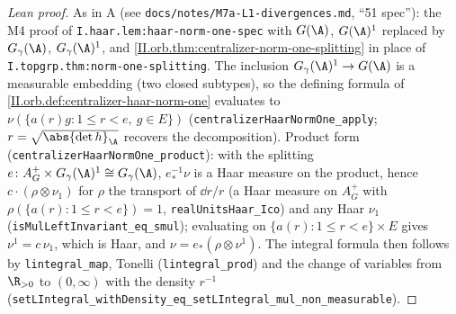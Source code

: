\begin{proof}[Lean proof]
As in A (see \texttt{docs/notes/M7a-L1-divergences.md}, ``51 spec''): the M4 proof of \texttt{I.haar.lem:haar-norm-one-spec} with $G(\A)$, $G(\A)^1$ replaced by $G_\gamma(\A)$, $G_\gamma(\A)^1$, and \cref{II.orb.thm:centralizer-norm-one-splitting} in place of \texttt{I.topgrp.thm:norm-one-splitting}. The inclusion $G_\gamma(\A)^1\to G(\A)$ is a measurable embedding (two closed subtypes), so the defining formula of \cref{II.orb.def:centralizer-haar-norm-one} evaluates to $\nu(\{a(r)g:1\le r<e,\ g\in E\})$ (\texttt{centralizerHaarNormOne\_apply}; $r=\sqrt{\abs{\det h}_\A}$ recovers the decomposition). Product form (\texttt{centralizerHaarNormOne\_product}): with the splitting $e\colon A_G^+\times G_\gamma(\A)^1\cong G_\gamma(\A)$, $e^{-1}_*\nu$ is a Haar measure on the product, hence $c\cdot(\rho\otimes\nu_1)$ for $\rho$ the transport of $\dd r/r$ (a Haar measure on $A_G^+$ with $\rho(\{a(r):1\le r<e\})=1$, \texttt{realUnitsHaar\_Ico}) and any Haar $\nu_1$ (\texttt{isMulLeftInvariant\_eq\_smul}); evaluating on $\{a(r):1\le r<e\}\times E$ gives $\nu^1=c\,\nu_1$, which is Haar, and $\nu=e_*(\rho\otimes\nu^1)$. The integral formula then follows by \texttt{lintegral\_map}, Tonelli (\texttt{lintegral\_prod}) and the change of variables from $\R_{>0}$ to $(0,\infty)$ with the density $r^{-1}$ (\texttt{setLIntegral\_withDensity\_eq\_setLIntegral\_mul\_non\_measurable}).
\end{proof}

